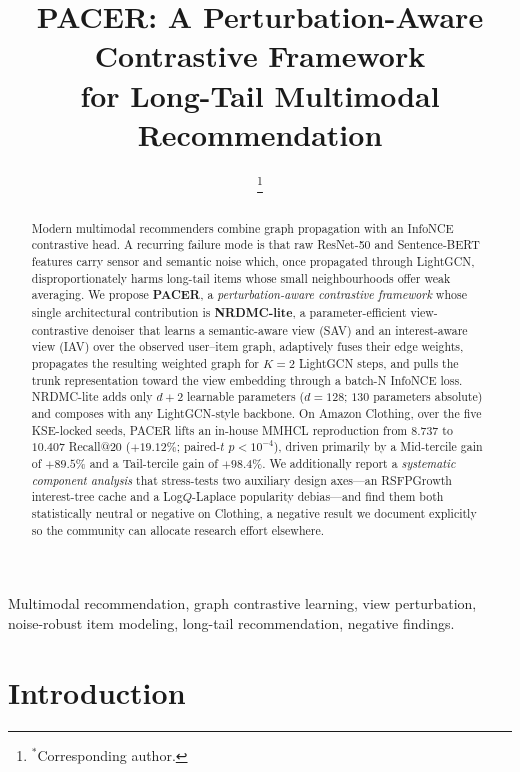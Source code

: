 \documentclass[conference]{IEEEtran}
\title{PACER: A Perturbation-Aware Contrastive Framework\\for Long-Tail Multimodal Recommendation}
\author{
\IEEEauthorblockN{Minh-Khoi Le, Duc-Trong Le$^{*}$}
\IEEEauthorblockA{VNU University of Engineering and Technology, Hanoi, Vietnam\\
\{khoilm, trongld\}@vnu.edu.vn}
\thanks{$^{*}$Corresponding author.}
}
\begin{document}
\maketitle

\begin{abstract}
Modern multimodal recommenders combine graph propagation with an
InfoNCE contrastive head. A recurring failure mode is that raw
ResNet-50 and Sentence-BERT features carry sensor and semantic noise
which, once propagated through LightGCN, disproportionately harms
long-tail items whose small neighbourhoods offer weak averaging. We
propose \textbf{PACER}, a \emph{perturbation-aware contrastive
framework} whose single architectural contribution is
\textbf{NRDMC-lite}, a parameter-efficient view-contrastive denoiser
that learns a semantic-aware view (SAV) and an interest-aware view
(IAV) over the observed user--item graph, adaptively fuses their edge
weights, propagates the resulting weighted graph for $K{=}2$ LightGCN
steps, and pulls the trunk representation toward the view embedding
through a batch-N InfoNCE loss. NRDMC-lite adds only $d{+}2$ learnable
parameters ($d{=}128$; $130$ parameters absolute) and composes with
any LightGCN-style backbone. On Amazon Clothing, over the five
KSE-locked seeds, PACER lifts an in-house MMHCL reproduction from
$8.737$ to $10.407$ Recall@20 ($+19.12\%$; paired-$t$ $p<10^{-4}$),
driven primarily by a Mid-tercile gain of $+89.5\%$ and a Tail-tercile
gain of $+98.4\%$. We additionally report a \emph{systematic component
analysis} that stress-tests two auxiliary design axes---an
RSFPGrowth interest-tree cache and a Log$Q$-Laplace popularity
debias---and find them both statistically neutral or negative on
Clothing, a negative result we document explicitly so the community
can allocate research effort elsewhere.
\end{abstract}

\begin{IEEEkeywords}
Multimodal recommendation, graph contrastive learning, view perturbation,
noise-robust item modeling, long-tail recommendation, negative findings.
\end{IEEEkeywords}

\section{Introduction}
\end{document}
